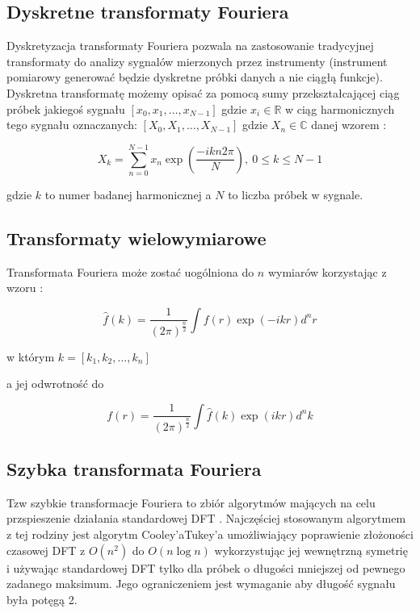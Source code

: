 \documentclass{artikel3}
\begin{document}
\subsection{Dyskretne transformaty Fouriera}
Dyskretyzacja transformaty Fouriera pozwala na zastosowanie tradycyjnej transformaty do analizy sygnalów mierzonych przez instrumenty (instrument pomiarowy generować będzie dyskretne próbki danych a nie ciągłą funkcje).
Dyskretna transformatę możemy opisać za pomocą sumy przekształcającej ciąg próbek jakiegoś sygnału $[x_0, x_1, \ldots, x_{N-1}]$ gdzie $x_i \in \mathbb{R}$ w ciąg harmonicznych tego sygnału oznaczanych: $[X_0, X_1, \ldots, X_{N-1}]$ gdzie $X_n \in \mathbb{C}$ danej wzorem \cite{python_numerical} :

\begin{equation}
    X_k = \sum_{n=0}^{N-1} x_n \exp{\left(\frac{-i k n 2\pi}{N}\right)} , \ 0 \le k \le N - 1
\end{equation}

gdzie $k$ to numer badanej harmonicznej a $N$ to liczba próbek w sygnale.

\subsection{Transformaty wielowymiarowe}

Transformata Fouriera może zostać uogólniona do $n$ wymiarów korzystając z wzoru \cite{math_phys}:

\begin{equation}
    \hat{f}(k) = \frac{1}{{(2\pi)}^\frac{n}{2}} \int f(r) \exp{(-ikr)} d^n r
\end{equation}

w którym $k=[k_1,k_2,\ldots, k_n]$

a jej odwrotność do 

\begin{equation}
    f(r) = \frac{1}{{(2\pi)}^\frac{n}{2}} \int \hat{f}(k) \exp{(ikr)} d^n k
\end{equation}


\subsection{Szybka transformata Fouriera} 
Tzw szybkie transformacje Fouriera to zbiór algorytmów mających na celu przspieszenie działania standardowej DFT
\cite{fft_algo_wiki}. Najczęściej stosowanym algorytmem z tej rodziny jest algorytm Cooley'a\-Tukey'a  umożliwiający poprawienie złożoności czasowej DFT z $O(n^2)$ do $O(n \log n)$\cite{marchewczyk}  wykorzystując jej wewnętrzną symetrię i używając standardowej DFT tylko dla próbek o długości mniejszej od pewnego zadanego maksimum. Jego ograniczeniem jest wymaganie aby długość sygnału była potęgą 2\cite{python_numerical}.  
\end{document}
